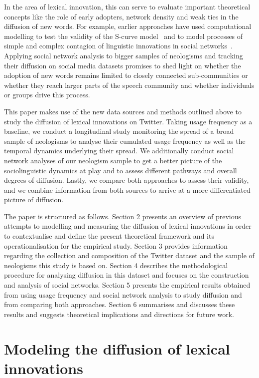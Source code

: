 \documentclass[draft, a4paper, abstract=on]{scrartcl}
\begin{document}
In the area of lexical innovation, this can serve to evaluate important theoretical concepts like the role of early adopters, network density and weak ties in the diffusion of new words. For example, earlier approaches have used computational modelling to test the validity of the S-curve model~\parencite{Blythe2012ScurvesMechanisms} and to model processes of simple and complex contagion of linguistic innovations in social networks~\parencite{Goel2016SocialDynamics}. Applying social network analysis to bigger samples of neologisms and tracking their diffusion on social media datasets promises to shed light on whether the adoption of new words remains limited to closely connected sub-communities or whether they reach larger parts of the speech community and whether individuals or groups drive this process.

This paper makes use of the new data sources and methods outlined above to study the diffusion of lexical innovations on Twitter. Taking usage frequency as a baseline, we conduct a longitudinal study monitoring the spread of a broad sample of neologisms to analyse their cumulated usage frequency as well as the temporal dynamics underlying their spread. We additionally conduct social network analyses of our neologism sample to get a better picture of the sociolinguistic dynamics at play and to assess different pathways and overall degrees of diffusion. Lastly, we compare both approaches to assess their validity, and we combine information from both sources to arrive at a more differentiated picture of diffusion.

The paper is structured as follows. Section 2 presents an overview of previous attempts to modelling and measuring the diffusion of lexical innovations in order to contextualise and define the present theoretical framework and its operationalisation for the empirical study. Section 3 provides information regarding the collection and composition of the Twitter dataset and the sample of neologisms this study is based on. Section 4 describes the methodological procedure for analysing diffusion in this dataset and focuses on the construction and analysis of social networks. Section 5 presents the empirical results obtained from using usage frequency and social network analysis to study diffusion and from comparing both approaches. Section 6 summarises and discusses these results and suggests theoretical implications and directions for future work.


\section{Modeling the diffusion of lexical innovations}
\end{document}
